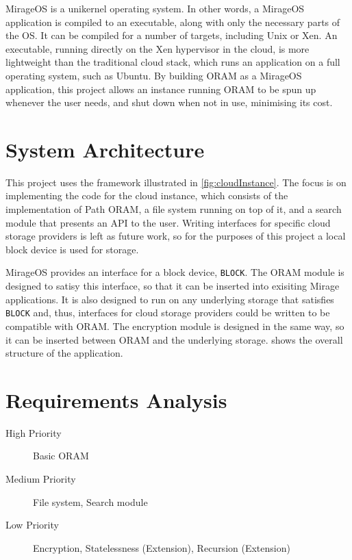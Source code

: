 \documentclass[12pt,a4paper,twoside,openright]{report}
\begin{document}
MirageOS is a unikernel operating system. In other words, a MirageOS application is compiled to an executable, along with only the necessary parts of the OS. It can be compiled for a number of targets, including Unix or Xen. An executable, running directly on the Xen hypervisor in the cloud, is more lightweight than the traditional cloud stack, which runs an application on a full operating system, such as Ubuntu. By building ORAM as a MirageOS application, this project allows an instance running ORAM to be spun up whenever the user needs, and shut down when not in use, minimising its cost.

\section{System Architecture}

This project uses the framework illustrated in \cref{fig:cloudInstance}. The focus is on implementing the code for the cloud instance, which consists of the implementation of Path ORAM, a file system running on top of it, and a search module that presents an API to the user. Writing interfaces for specific cloud storage providers is left as future work, so for the purposes of this project a local block device is used for storage.

MirageOS provides an interface for a block device, \texttt{BLOCK}. The ORAM module is designed to satisy this interface, so that it can be inserted into exisiting Mirage applications. It is also designed to run on any underlying storage that satisfies \texttt{BLOCK} and, thus, interfaces for cloud storage providers could be written to be compatible with ORAM. The encryption module is designed in the same way, so it can be inserted between ORAM and the underlying storage.  shows the overall structure of the application.

\setlength{\unitlength}{0.75mm}

\setlength{\unitlength}{0.5mm}

\section{Requirements Analysis}

\begin{description}
    \item [High Priority] Basic ORAM
    \item [Medium Priority] File system, Search module
    \item [Low Priority] Encryption, Statelessness (Extension), Recursion (Extension)
\end{description}
\end{document}
